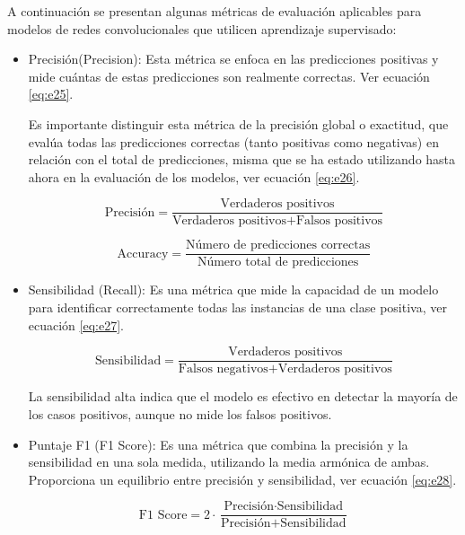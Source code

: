 A continuación se presentan algunas métricas de evaluación aplicables para modelos de redes convolucionales que utilicen aprendizaje supervisado:

\begin{itemize}

\item Precisión(Precision): Esta métrica se enfoca en las predicciones positivas y mide cuántas de estas predicciones son realmente correctas. Ver ecuación \ref{eq:e25}.

Es importante distinguir esta métrica de la precisión global o exactitud, que evalúa todas las predicciones correctas (tanto positivas como negativas) en relación con el total de predicciones, misma que se ha estado utilizando hasta ahora en la evaluación de los modelos, ver ecuación \ref{eq:e26}.


\begin{equation} \label{eq:e25} 
	\text{Precisión} = \frac{\text{Verdaderos positivos}}{\text{Verdaderos positivos} + \text{Falsos positivos}}
\end{equation}

\begin{equation} \label{eq:e26} 
	\text{Accuracy} = \frac{\text{Número de predicciones correctas}}{\text{Número total de predicciones} }
\end{equation}

\item Sensibilidad (Recall): Es una métrica que mide la capacidad de un modelo para identificar correctamente todas las instancias de una clase positiva, ver ecuación \ref{eq:e27}.

\begin{equation} \label{eq:e27} 
	\text{Sensibilidad} = \frac{\text{Verdaderos positivos}}{\text{Falsos negativos} + \text{Verdaderos positivos} }
\end{equation}

La sensibilidad alta indica que el modelo es efectivo en detectar la mayoría de los casos positivos, aunque no mide los falsos positivos.

\item Puntaje F1 (F1 Score): Es una métrica que combina la precisión y la sensibilidad en una sola medida, utilizando la media armónica de ambas. Proporciona un equilibrio entre precisión y sensibilidad, ver ecuación \ref{eq:e28}.

\begin{equation} \label{eq:e28}
	\text{F1 Score} = 2 \cdot \frac{\text{Precisión}\cdot\text{Sensibilidad}}{\text{Precisión} + \text{Sensibilidad} }
\end{equation}


\end{itemize}
